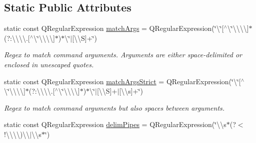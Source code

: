 \subsection*{Static Public Attributes}
\begin{DoxyCompactItemize}
\item 
static const Q\-Regular\-Expression \hyperlink{class_command_interpreter_a5fb8575efe24f40344f656b82b7348fa}{match\-Args} = Q\-Regular\-Expression(\char`\"{}\textbackslash{}\char`\"{}\mbox{[}$^\wedge$\textbackslash{}\char`\"{}\textbackslash{}\textbackslash{}\textbackslash{}\textbackslash{}\mbox{]}$\ast$(?\-:\textbackslash{}\textbackslash{}\textbackslash{}\textbackslash{}.\mbox{[}$^\wedge$\textbackslash{}\char`\"{}\textbackslash{}\textbackslash{}\textbackslash{}\textbackslash{}\mbox{]}$\ast$)$\ast$\textbackslash{}\char`\"{}$|$\mbox{[}\textbackslash{}\textbackslash{}S\mbox{]}+\char`\"{})
\begin{DoxyCompactList}\small\item\em Regex to match command arguments. Arguments are either space-\/delimited or enclosed in unescaped quotes.\par
 {\bfseries  }\end{DoxyCompactList}\item 
static const Q\-Regular\-Expression \hyperlink{class_command_interpreter_afd08ad40b67d0d24dff5c6d992e55bad}{match\-Args\-Strict} = Q\-Regular\-Expression(\char`\"{}\textbackslash{}\char`\"{}\mbox{[}$^\wedge$\textbackslash{}\char`\"{}\textbackslash{}\textbackslash{}\textbackslash{}\textbackslash{}\mbox{]}$\ast$(?\-:\textbackslash{}\textbackslash{}\textbackslash{}\textbackslash{}.\mbox{[}$^\wedge$\textbackslash{}\char`\"{}\textbackslash{}\textbackslash{}\textbackslash{}\textbackslash{}\mbox{]}$\ast$)$\ast$\textbackslash{}\char`\"{}$|$\mbox{[}\textbackslash{}\textbackslash{}S\mbox{]}+$|$\mbox{[}\textbackslash{}\textbackslash{}s\mbox{]}+\char`\"{})
\begin{DoxyCompactList}\small\item\em Regex to match command arguments but also spaces between arguments.\par
 {\bfseries  }\end{DoxyCompactList}\item 
static const Q\-Regular\-Expression \hyperlink{class_command_interpreter_ab4511b44fc5231f0527644e41b057398}{delim\-Pipes} = Q\-Regular\-Expression(\char`\"{}\textbackslash{}\textbackslash{}s$\ast$(?$<$!\textbackslash{}\textbackslash{}\textbackslash{}\textbackslash{})\textbackslash{}\textbackslash{}$|$\textbackslash{}\textbackslash{}s$\ast$\char`\"{})

\end{DoxyCompactItemize}
